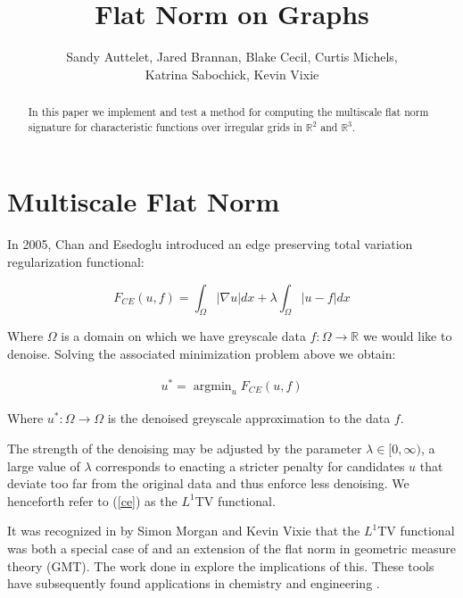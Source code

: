 \documentclass[12pt]{article}
\title{Flat Norm on Graphs}
\author{Sandy Auttelet, Jared Brannan, Blake Cecil, Curtis Michels,\\
 Katrina Sabochick, Kevin Vixie }
\DeclareMathOperator*{\argmin}{argmin}
\begin{document}
\maketitle

\begin{abstract}
In this paper we implement and test a method for computing the multiscale flat norm signature for characteristic functions over irregular grids in $\mathbb{R}^2$ and $\mathbb{R}^3$.
\end{abstract}

\tableofcontents

\section{Multiscale Flat Norm}

In 2005, Chan and Esedoglu introduced an edge preserving total variation regularization functional:

\begin{equation} \label{ce}
F_{CE}(u,f) = \int_\Omega |\nabla u| dx + \lambda \int_{\Omega} |u-f|dx
\end{equation}

\noindent  Where $\Omega$ is a domain on which we have greyscale data $f:\Omega \to \mathbb{R}$ we would like to denoise. Solving the associated minimization problem above we obtain:

\begin{align*}
u^* = \argmin_u F_{CE}(u,f)
\end{align*}

 \noindent Where $u^*: \Omega \rightarrow \Omega$ is the denoised greyscale approximation to the data $f$.
 
The strength of the denoising may be adjusted by the parameter $\lambda \in [0,\infty)$, a large value of $\lambda$ corresponds to enacting a stricter penalty for candidates $u$ that deviate too far from the original data and thus enforce less denoising. We henceforth refer to (\ref{ce}) as the $L^1$TV functional.

It was recognized in \cite{Morgan_2007} by Simon Morgan and Kevin Vixie that the $L^1$TV functional was both a special case of and an extension of the flat norm in geometric measure theory (GMT). The work done in \cite{shapes, hu_median, ibrahim_simplicial, fn_decomp} explore the implications of this. These tools have subsequently found applications in chemistry \cite{flat_norm_chemistry_fingers} and engineering \cite{meyur2023structural, aouada2009squigraphs}.
\end{document}
